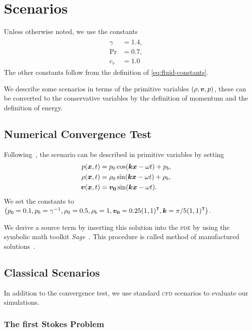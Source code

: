 \chapter{Scenarios}\label{sec:scenarios}
Unless otherwise noted, we use the constants
\begin{align}
\begin{split}
  \gamma &= 1.4, \\
  \Pr &= 0.7, \\
  c_v &= 1.0
\end{split}
\end{align}
The other constants follow from the definition of \cref{eq:fluid-constants}.

We describe some scenarios in terms of the primitive variables $(\rho, \bm{v}, p)$, these can be converted to the conservative variables by the definition of momentum and the definition of energy.   
\section{Numerical Convergence Test}
Following~\cite{dumbser2010arbitrary}, the scenario can be described in primitive variables by setting
\begin{align}
\begin{split}
  p(\bm{x}, t) &= p_0 \cos( \bm{k} \bm{x} - \omega t ) + p_b, \\
  \rho(\bm{x}, t) &= \rho_0 \sin (\bm{k} \bm{x} - \omega t) + \rho_b, \\
  \bm{v}(\bm{x}, t) &= \bm{v_0} \sin(\bm{k} \bm{x} - \omega t).
\end{split}
\end{align}
We set the constants to \( \left(  p_0 = 0.1, p_b = \gamma^{-1}, \rho_0 = 0.5, \rho_b = 1, 
\bm{v_0} = 0.25 {(1,1)}^\intercal, \bm{k} = \pi/5 {(1,1)}^\intercal \right) \).

We derive a source term by inserting this solution into the \textsc{pde} by using the symbolic math toolkit \textit{Sage}~\cite{sagemath}.
This procedure is called method of manufactured solutions~\cite{salari2000code}.

\section{Classical Scenarios}
In addition to the convergence test, we use standard \textsc{cfd} scenarios to evaluate our simulations.


\subsection{The first Stokes Problem}
\cite{dumbser2010arbitrary}
